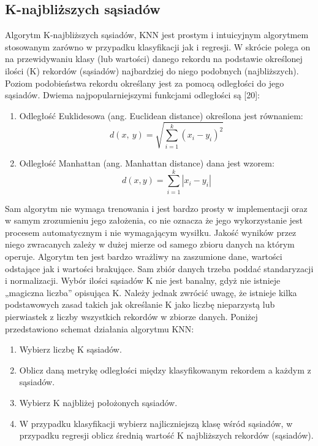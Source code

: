 \documentclass[a4paper,12pt,oneside]{book}
\begin{document}
\subsection{K-najbliższych sąsiadów}
Algorytm K-najbliższych sąsiadów, KNN jest prostym i intuicyjnym algorytmem stosowanym zarówno w przypadku klasyfikacji jak i regresji. W skrócie polega on na przewidywaniu klasy (lub wartości) danego rekordu na podstawie określonej ilości (K) rekordów (sąsiadów) najbardziej do niego podobnych (najbliższych). Poziom podobieństwa rekordu określany jest za pomocą odległości do jego sąsiadów. Dwiema najpopularniejszymi funkcjami odległości są [20]:
\begin{enumerate}
    \item Odległość Euklidesowa (ang. Euclidean distance) określona jest równaniem:
    \begin{equation}
     d\left(x,\ y\right)=\sqrt{\sum^k_{i=1}{{\left(x_i-y_i\right)}^2}}   
    \end{equation}
    \item Odległość Manhattan (ang. Manhattan distance) dana jest wzorem:
    \begin{equation}
     d\left(x,y\right)=\sum^k_{i=1}{|x_i-y_i|}  
    \end{equation}
\end{enumerate}
Sam algorytm nie wymaga trenowania i jest bardzo prosty w implementacji oraz w samym zrozumieniu jego założenia, co nie oznacza że jego wykorzystanie jest procesem automatycznym i nie wymagającym wysiłku. Jakość wyników przez niego zwracanych zależy w dużej mierze od samego zbioru danych na którym operuje. Algorytm ten jest bardzo wrażliwy na zaszumione dane, wartości odstające jak i wartości brakujące. Sam zbiór danych trzeba poddać standaryzacji i normalizacji. Wybór ilości sąsiadów K nie jest banalny, gdyż nie istnieje „magiczna liczba” opisująca K. Należy jednak zwrócić uwagę, że istnieje kilka podstawowych zasad takich jak określanie K jako liczbę nieparzystą lub pierwiastek z liczby wszystkich rekordów w zbiorze danych. Poniżej przedstawiono schemat działania algorytmu KNN:
\begin{enumerate}
    \item Wybierz liczbę K sąsiadów.
    \item Oblicz daną metrykę odległości między klasyfikowanym rekordem a każdym z sąsiadów.
    \item Wybierz K najbliżej położonych sąsiadów.
    \item W przypadku klasyfikacji wybierz najliczniejszą klasę wśród sąsiadów, w przypadku regresji oblicz średnią wartość K najbliższych rekordów (sąsiadów).
\end{enumerate}
\end{document}
